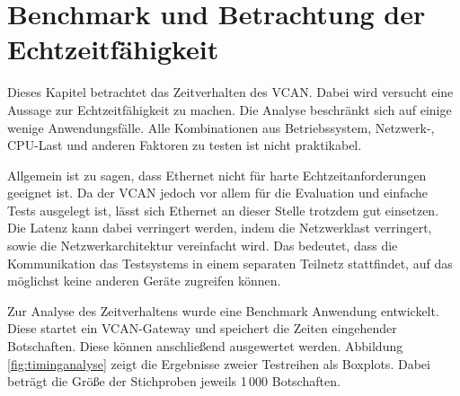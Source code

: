 \documentclass[
  a4paper,					    %
  twoside,
  DIV=calc,     				%
  bibliography=totoc,
  cleardoublepage=empty,
  ngerman,     					%
  final       					%
]{scrbook}
\begin{document}
% 
\section{Benchmark und Betrachtung der Echtzeitfähigkeit}
\label{sec:Benchmark}
Dieses Kapitel betrachtet das Zeitverhalten des VCAN. Dabei wird versucht eine Aussage zur Echtzeitfähigkeit zu machen. Die Analyse beschränkt sich auf einige wenige Anwendungsfälle. Alle Kombinationen aus Betriebssystem, Netzwerk-, CPU-Last und anderen Faktoren zu testen ist nicht praktikabel.

Allgemein ist zu sagen, dass Ethernet nicht für harte Echtzeitanforderungen geeignet ist. Da der VCAN jedoch vor allem für die Evaluation und einfache Tests ausgelegt ist, lässt sich Ethernet an dieser Stelle trotzdem gut einsetzen. Die Latenz kann dabei verringert werden, indem die Netzwerklast verringert, sowie die Netzwerkarchitektur vereinfacht wird. Das bedeutet, dass die Kommunikation das Testsystems in einem separaten Teilnetz stattfindet, auf das möglichst keine anderen Geräte zugreifen können. 

Zur Analyse des Zeitverhaltens wurde eine Benchmark Anwendung entwickelt. Diese startet ein VCAN-Gateway und speichert die Zeiten eingehender Botschaften. Diese können anschließend ausgewertet werden. Abbildung \ref{fig:timinganalyse} zeigt die Ergebnisse zweier Testreihen als Boxplots. Dabei beträgt die Größe der Stichproben jeweils 1\,000 Botschaften.
\end{document}
